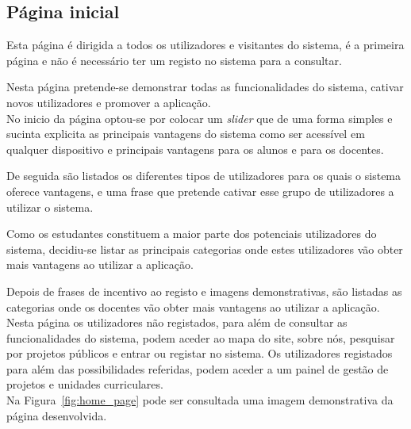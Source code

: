 \subsection{Página inicial}

Esta página é dirigida a todos os utilizadores e visitantes do sistema, é a primeira página e não é necessário ter um registo no sistema para a consultar.

Nesta página pretende-se demonstrar todas as funcionalidades do sistema, cativar novos utilizadores e promover a aplicação.\\

No inicio da página optou-se por colocar um \textit{slider} que de uma forma simples e sucinta explicita as principais vantagens do sistema como ser acessível em qualquer dispositivo e principais vantagens para os alunos e para os docentes.

De seguida são listados os diferentes tipos de utilizadores para os quais o sistema oferece vantagens, e uma frase que pretende cativar esse grupo de utilizadores a utilizar o sistema.

Como os estudantes constituem a maior parte dos potenciais utilizadores do sistema, decidiu-se listar as principais categorias onde estes utilizadores vão obter mais vantagens ao utilizar a aplicação.

Depois de frases de incentivo ao registo e imagens demonstrativas, são listadas as categorias onde os docentes vão obter mais vantagens ao utilizar a aplicação.\\

Nesta página os utilizadores não registados, para além de consultar as funcionalidades do sistema, podem aceder ao mapa do site, sobre nós, pesquisar por projetos públicos e entrar ou registar no sistema.
Os utilizadores registados para além das possibilidades referidas, podem aceder a um painel de gestão de projetos e unidades curriculares.\\ 

Na Figura~\ref{fig:home_page} pode ser consultada uma imagem demonstrativa da página desenvolvida.

